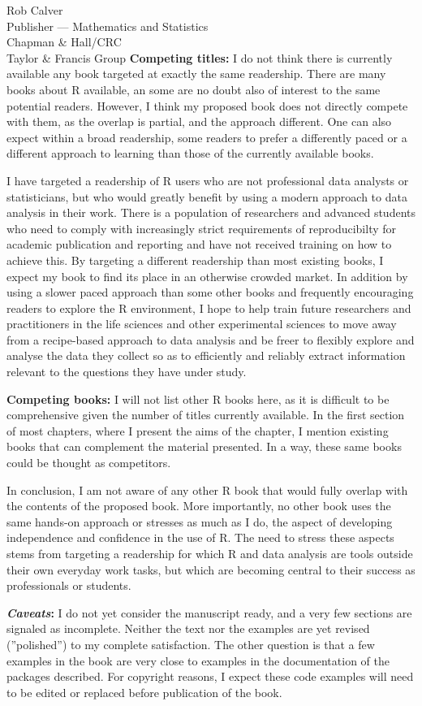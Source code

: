 \documentclass[a4paper]{scrlttr2}
\begin{document}
\begin{letter}{Rob Calver\\Publisher --- Mathematics and Statistics\\ Chapman \& Hall/CRC\\ Taylor \& Francis Group}
\textbf{Competing titles:} I do not think there is currently available any book targeted at exactly the same readership. There are many books about R available, an some are no doubt also of interest to the same potential readers. However, I think my proposed book does not directly compete with them, as the overlap is partial, and the approach different. One can also expect within a broad readership, some readers to prefer a differently paced or a different approach to learning than those of the currently available books.

I have targeted a readership of R users who are not professional data analysts or statisticians, but who would greatly benefit by using a modern approach to data analysis in their work. There is a population of researchers and advanced students who need to comply with increasingly strict requirements of reproducibilty for academic publication and reporting and have not received training on how to achieve this. By targeting a different readership than most existing books, I expect my book to find its place in an otherwise crowded market. In addition by using a slower paced approach than some other books and frequently encouraging readers to explore the R environment, I hope to help train future researchers and practitioners in the life sciences and other experimental sciences to move away from a recipe-based approach to data analysis and be freer to flexibly explore and analyse the data they collect so as to efficiently and reliably extract information relevant to the questions they have under study.

\textbf{Competing books:} I will not list other R books here, as it is difficult to be comprehensive given the number of titles currently available. In the first section of most chapters, where I present the aims of the chapter, I mention existing books that can complement the material presented. In a way, these same books could be thought as competitors.

In conclusion, I am not aware of any other R book that would fully overlap with the contents of the proposed book. More importantly, no other book uses the same hands-on approach or stresses as much as I do, the aspect of developing independence and confidence in the use of R. The need to stress these aspects stems from targeting a readership for which R and data analysis are tools outside their own everyday work tasks, but which are becoming central to their success as professionals or students.

\textbf{\emph{Caveats}:} I do not yet consider the manuscript ready, and a very few sections are signaled as incomplete. Neither the text nor the examples are yet revised (''polished'') to my complete satisfaction. The other question is that a few examples in the book are very close to examples in the documentation of the packages described. For copyright reasons, I expect these code examples will need to be edited or replaced before publication of the book.


\end{letter}
\end{document}
